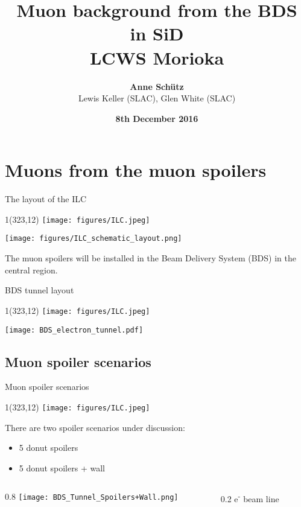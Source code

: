\documentclass[xcolor={dvipsnames}]{beamer}
\title[ILC \& Muons from spoilers]{\textbf{\LARGE Muon background from the BDS\\in SiD} \\ \vspace*{0.3cm} \small LCWS Morioka}
\author[Anne Sch\"utz]{\textbf{Anne Sch\"utz}\\Lewis Keller (SLAC), Glen White (SLAC)}
\institute{\textbf{DESY}}
\date{\textbf{8th December 2016}}
\newcommand{\ilclogo}{
  \setlength{\TPHorizModule}{1pt}
  \setlength{\TPVertModule}{1pt}
  \begin{textblock}{1}(323,12)
   \texttt{[image: figures/ILC.jpeg]}
  \end{textblock}
}
\begin{document}
{
\begin{frame}
  \titlepage
\end{frame}
}
\begin{frame}
  \tableofcontents
\end{frame}

\section{Muons from the muon spoilers}
\begin{frame}{The layout of the ILC}
\ilclogo
\begin{center}
\texttt{[image: figures/ILC\_schematic\_layout.png]}
\end{center}
The muon spoilers will be installed in the Beam Delivery System (BDS) in the central region.
\end{frame}

\begin{frame}{BDS tunnel layout}
\ilclogo
\begin{center}
\texttt{[image: BDS\_electron\_tunnel.pdf]}
\end{center}
\end{frame}

\subsection{Muon spoiler scenarios}
\begin{frame}{Muon spoiler scenarios}
\ilclogo
There are two spoiler scenarios under discussion:
\begin{itemize}
 \item 5 donut spoilers
 \item 5 donut spoilers + wall
\end{itemize}

\begin{columns}[b]
 \begin{column}{0.8\textwidth}
 \flushright
\texttt{[image: BDS\_Tunnel\_Spoilers+Wall.png]}
\end{column}
 \begin{column}{0.2\textwidth}
 \flushleft
e\textsuperscript{-} beam line
\vspace*{0.55cm}
\end{column}
\end{columns}
\end{frame}
\end{document}
